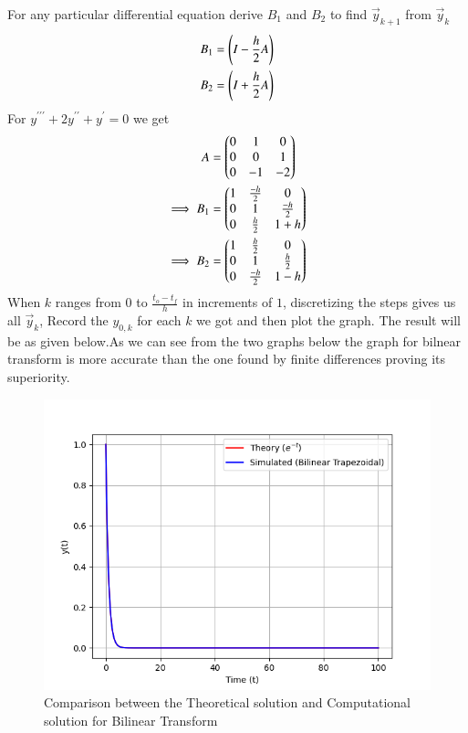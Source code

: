 \documentclass[journal]{IEEEtran}
\begin{document}
For any particular differential equation derive $B_1$ and $B_2$ to find $\vec{y}_{k+1}$ from $\vec{y}_k$
\begin{align}
    B_1=\left(I-\frac{h}{2}A\right)\\
    B_2=\left(I+\frac{h}{2}A\right)
\end{align}
For $y^{\prime\prime\prime}+2y^{\prime\prime}+y^{\prime} = 0$ we get
\begin{align}
    A&=\begin{pmatrix}0&1&0\\0&0&1\\0&-1&-2\end{pmatrix}\\
    \implies B_1&=\begin{pmatrix}1&\frac{-h}{2}&0\\0&1&\frac{-h}{2}\\0&\frac{h}{2}&1+h\end{pmatrix}\\
    \implies B_2&=\begin{pmatrix}1&\frac{h}{2}&0\\0&1&\frac{h}{2}\\0&\frac{-h}{2}&1-h\end{pmatrix}\\
\end{align}
When $k$ ranges from $0$ to $\frac{t_o-t_f}{h}$ in increments of $1$, discretizing the steps gives us all $\vec{y}_k$, Record the $y_{0,k}$ for each $k$ we got and then plot the graph. The result will be as given below.As we can see from the two graphs below the graph for bilnear transform is more accurate than the one found by finite differences proving its superiority.
\begin{figure}[H]
   \centering
   \includegraphics[width=1\linewidth]{figs/fig.png}
   \caption{Comparison between the Theoretical solution and Computational solution for Bilinear Transform}
   \label{stemplot}
  \end{figure}
\end{document}
